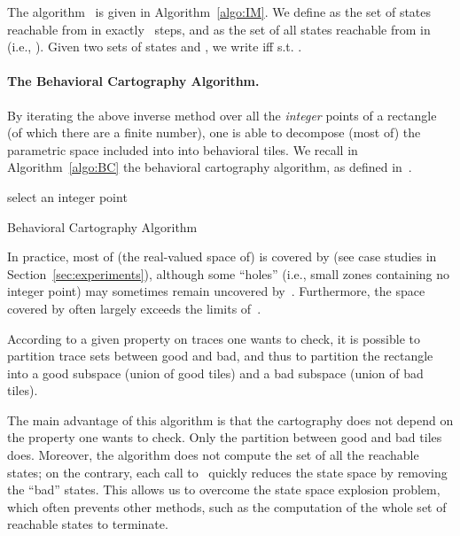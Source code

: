 \documentclass[submission,copyright,creativecommons]{eptcs}
\newcommand{\paragraphe}[1]{\paragraph{#1.}}
\begin{document}
The algorithm~ is given in Algorithm~\ref{algo:IM}.
We define  as the set of states reachable from  in exactly ~steps,
and  as the set of all states reachable from  in 
(i.e., ).
Given two sets of states  and , we write  iff
 s.t. .



\paragraphe{The Behavioral Cartography Algorithm} \label{ss:bc}





By iterating the above inverse method  over all the \emph{integer} points of a rectangle  (of which there are a finite number), one is able to decompose (most of) the parametric space included into  into behavioral tiles.
We recall in Algorithm~\ref{algo:BC} the behavioral cartography algorithm, as defined in~\cite{af10}.



\IncMargin{1em}
\begin{algorithm}[ht!]



\BlankLine

{
	select an integer point \; 
}

\caption{Behavioral Cartography Algorithm  }\label{algo:tiling}
\label{algo:BC}
\end{algorithm}\DecMargin{1em}





In practice, most of (the real-valued space of)  is covered by  (see case studies in Section~\ref{sec:experiments}), although some ``holes'' (i.e., small zones containing no integer point) may sometimes remain uncovered by~.
Furthermore, the space covered by  often largely exceeds the limits of~. 

According to a given property on traces one wants to check, it is possible to partition trace sets between good and bad, and thus to partition
the rectangle  into a good subspace (union of good tiles) and a bad subspace (union of bad tiles). 


The main advantage of this algorithm is that the cartography does not depend on the property one wants to check.
Only the partition between good and bad tiles does. Moreover, the algorithm does not compute the set of all the reachable states;
on the contrary, each call to~ quickly reduces the state space by removing the ``bad'' states.
This allows us to overcome the state space explosion problem, which often prevents other methods, such as the computation of the whole set of reachable states to terminate. 
\end{document}
